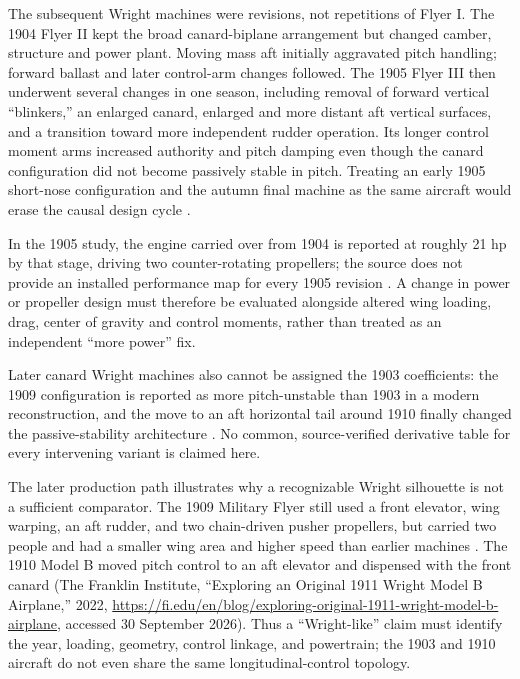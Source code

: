\documentclass[11pt,a4paper]{article}
\begin{document}
The subsequent Wright machines were revisions, not repetitions of Flyer I.
The 1904 Flyer II kept the broad canard-biplane arrangement but changed
camber, structure and power plant. Moving mass aft initially aggravated
pitch handling; forward ballast and later control-arm changes followed.
The 1905 Flyer III then underwent several changes in one season, including
removal of forward vertical ``blinkers,'' an enlarged canard, enlarged and
more distant aft vertical surfaces, and a transition toward more independent
rudder operation. Its longer control moment arms increased authority and
pitch damping even though the canard configuration did not become passively
stable in pitch. Treating an early 1905 short-nose configuration and the
autumn final machine as the same aircraft would erase the causal design
cycle \cite{ref41,ref42,ref10}.

In the 1905 study, the engine carried over from 1904 is reported at roughly
21 hp by that stage, driving two counter-rotating propellers; the source
does not provide an installed performance map for every 1905 revision
\cite{ref10}. A change in power or propeller design must therefore be
evaluated alongside altered wing loading, drag, center of gravity and
control moments, rather than treated as an independent ``more power'' fix.

Later canard Wright machines also cannot
be assigned the 1903 coefficients: the 1909 configuration is reported as
more pitch-unstable than 1903 in a modern reconstruction, and the move to
an aft horizontal tail around 1910 finally changed the passive-stability
architecture \cite{ref41}. No common, source-verified derivative table for
every intervening variant is claimed here.

The later production path illustrates why a recognizable Wright silhouette
is not a sufficient comparator. The 1909 Military Flyer still used a front
elevator, wing warping, an aft rudder, and two chain-driven pusher
propellers, but carried two people and had a smaller wing area and higher
speed than earlier machines \cite{ref44}. The 1910 Model B moved pitch
control to an aft elevator and dispensed with the front canard
\cite{ref41} (The Franklin Institute, ``Exploring an Original 1911 Wright Model B Airplane,'' 2022, \url{https://fi.edu/en/blog/exploring-original-1911-wright-model-b-airplane}, accessed 30 September 2026). Thus a ``Wright-like'' claim must identify the year,
loading, geometry, control linkage, and powertrain; the 1903 and 1910
aircraft do not even share the same longitudinal-control topology.
\end{document}

